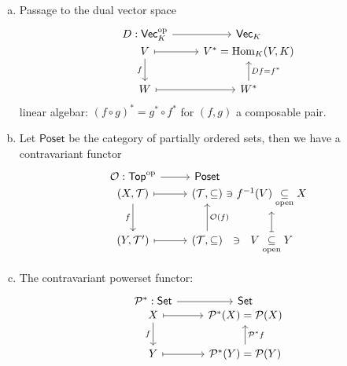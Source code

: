 \documentclass[a4paper]{report}
\begin{document}
\begin{exmps*}
  \begin{enumerate}[(a)]
    \item Passage to the dual vector space
          \[\begin{tikzcd}
              {D: \Vec_{K}\op} \arrow[r] & \Vec_{K} \\[-20pt]
V \arrow[r, maps to] \arrow[d, "f"'] & {V^* = \Hom_K(V,K)}        \\
W \arrow[r, maps to]                 & W^* \arrow[u, "Df = f^*"']
\end{tikzcd}\]
          linear algebar: $(f \circ g)^{*} = g^{*} \circ f^{*}$ for $(f,g)$ a composable pair.
    \item Let $\mathsf{Poset}$ be the category of partially ordered sets, then we have a contravariant functor
          \[\begin{tikzcd}
\mathcal O: \mathsf{Top}^\mathrm{op} \arrow[r]       & \mathsf{Poset}                                        &[-20pt]                                  \\[-20pt]
{(X, \mathcal T)} \arrow[r, maps to] \arrow[d, "f"'] & {(\mathcal T, \subseteq)} \arrow[r, phantom, "\ni"]                            &[-20pt] f^{-1}(V) \underset{\text{open}}\subseteq X            \\
{(Y, \mathcal T')} \arrow[r, maps to]                & {(\mathcal T, \subseteq)} \arrow[u, "\mathcal O(f)"'] \arrow[r, phantom, "\ni"] &[-20pt] V \underset{\text{open}}\subseteq Y \arrow[u, maps to]
\end{tikzcd}\]
    \item The contravariant powerset functor:
          \[\begin{tikzcd}
\mathcal P^*: \Set \arrow[r]                  & \Set                                                        \\[-20pt]
X \arrow[r, maps to] \arrow[d, "f"'] & \mathcal P^*(X) = \mathcal P(X)                             \\
Y \arrow[r, maps to]                 & \mathcal P^*(Y) = \mathcal P(Y) \arrow[u, "\mathcal P^*f"']
\end{tikzcd}\]
  \end{enumerate}
\end{exmps*}
\end{document}
